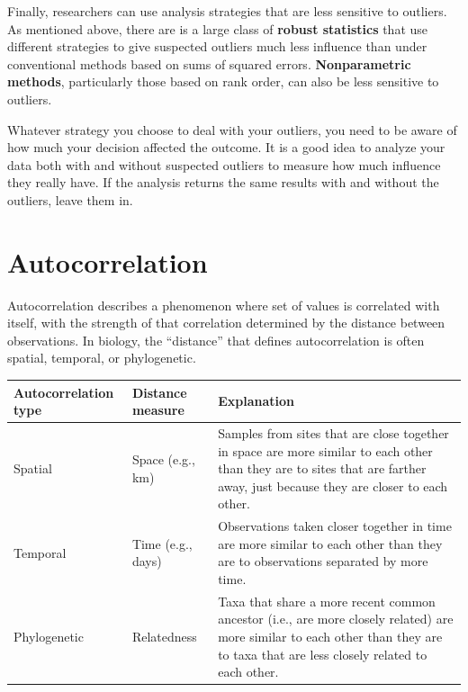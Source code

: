 \documentclass[
  13,
  letterpaper,
]{report}
\begin{document}
Finally, researchers can use analysis strategies that are less sensitive
to outliers. As mentioned above, there are is a large class of
\textbf{robust statistics} that use different strategies to give
suspected outliers much less influence than under conventional methods
based on sums of squared errors. \textbf{Nonparametric methods},
particularly those based on rank order, can also be less sensitive to
outliers.

Whatever strategy you choose to deal with your outliers, you need to be
aware of how much your decision affected the outcome. It is a good idea
to analyze your data both with and without suspected outliers to measure
how much influence they really have. If the analysis returns the same
results with and without the outliers, leave them in.

\section{Autocorrelation}\label{sec-problems-auto}

Autocorrelation describes a phenomenon where set of values is correlated
with itself, with the strength of that correlation determined by the
distance between observations. In biology, the ``distance'' that defines
autocorrelation is often spatial, temporal, or phylogenetic.

\begin{longtable}[]{@{}
  >{\raggedright\arraybackslash}p{}
  >{\raggedright\arraybackslash}p{}
  >{\raggedright\arraybackslash}p{}@{}}
\toprule\noalign{}
\begin{minipage}[b]{\linewidth}\raggedright
Autocorrelation type
\end{minipage} & \begin{minipage}[b]{\linewidth}\raggedright
Distance measure
\end{minipage} & \begin{minipage}[b]{\linewidth}\raggedright
Explanation
\end{minipage} \\
\midrule\noalign{}
\endhead
\bottomrule\noalign{}
\endlastfoot
Spatial & Space (e.g., km) & Samples from sites that are close together
in space are more similar to each other than they are to sites that are
farther away, just because they are closer to each other. \\
Temporal & Time (e.g., days) & Observations taken closer together in
time are more similar to each other than they are to observations
separated by more time. \\
Phylogenetic & Relatedness & Taxa that share a more recent common
ancestor (i.e., are more closely related) are more similar to each other
than they are to taxa that are less closely related to each other. \\
\end{longtable}
\end{document}

